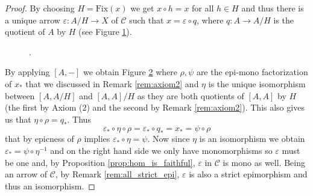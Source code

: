 \documentclass[italian, 12pt, reqno]{article}
\theoremstyle{myteo}
\numberwithin{equation}{section}
\newcommand{\cat}[1]{\mathscr{#1}}
\newcommand{\fix}[1]{\text{Fix}(#1)}
\newcommand{\homs}[2]{[#1, #2]}
\newcommand{\fun}[3]{#1\colon#2\to #3}
\begin{document}
\begin{proof}
	By choosing \(H = \fix{x}\) we get \(x\circ h = x\) for all \(h\in H\) and thus there is a unique arrow \(\fun{\varepsilon}{A/H}{X}\) of \(\cat{C}\) such that \(x = \varepsilon\circ q\), where \(\fun{q}{A}{A/H}\) is the quotient of \(A\) by \(H\) (see Figure \ref{diagram:varepsilon}).
  \begin{figure}
    \begin{center}
      .
    \end{center}
    \caption{}
    \label{diagram:varepsilon}
  \end{figure}
	\begin{figure}
    \begin{center}
    \end{center}
    \caption{}
    \label{diagram:big_diagram}
  \end{figure}

	By applying \(\homs{A}{-}\) we obtain Figure \ref{diagram:big_diagram} where \(\rho, \psi\) are the epi-mono factorization of \(x_*\) that we discussed in Remark \ref{rem:axiom2} and \(\eta\) is the unique isomorphism between \([A, A/H]\) and \([A, A]/H\) as they are both quotients of \([A, A]\) by \(H\) (the first by Axiom (2) and the second by Remark \ref{rem:axiom2}).
        This also gives us that \(\eta \circ \rho = q_*\).
        Thus
  \[\varepsilon_*\circ \eta\circ\rho = \varepsilon_*\circ q_* = x_* = \psi\circ \rho\]
  that by epicness of \(\rho\) implies \(\varepsilon_*\circ \eta = \psi\).
  Now since \(\eta\) is an isomorphism we obtain \(\varepsilon_* = \psi \circ \eta^{-1}\) and on the right hand side we only have monomorphisms so \(\varepsilon\) must be one and, by Proposition \ref{prop:hom_is_faithful}, \(\varepsilon\) in \(\cat{C}\) is mono as well.
  Being an arrow of \(\cat{C}\), by Remark \ref{rem:all_strict_epi}, \(\varepsilon\) is also a strict epimorphism and thus an isomorphism.
\end{proof}
\end{document}
